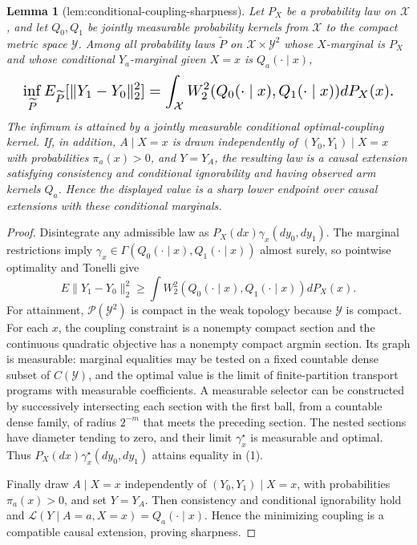 \documentclass{article}
\newtheorem{lemma}{Lemma}
\begin{document}
\begin{lemma}[lem:conditional-coupling-sharpness]\label{lem:conditional-coupling-sharpness}
Let \(P_X\) be a probability law on \(\mathcal X\), and let \(Q_0,Q_1\) be jointly measurable probability kernels from \(\mathcal X\) to the compact metric space \(\mathcal Y\). Among all probability laws \(\widetilde P\) on \(\mathcal X\times\mathcal Y^2\) whose \(X\)-marginal is \(P_X\) and whose conditional \(Y_a\)-marginal given \(X=x\) is \(Q_a(\cdot\mid x)\),
\[
\makebox[\linewidth][c]{\resizebox{0.98\linewidth}{!}{\par\noindent \makebox[\linewidth][c]{\resizebox{0.98\linewidth}{!}{\(\displaystyle \displaystyle \inf_{\widetilde P}E_{\widetilde P}[\lVert Y_1-Y_0\rVert_2^2]=\int_{\mathcal X}W_2^2(Q_0(\cdot\mid x),Q_1(\cdot\mid x))dP_X(x).\)}}\par\noindent}}
\]
The infimum is attained by a jointly measurable conditional optimal-coupling kernel. If, in addition, \(A\mid X=x\) is drawn independently of \((Y_0,Y_1)\mid X=x\) with probabilities \(\pi_a(x)>0\), and \(Y=Y_A\), the resulting law is a causal extension satisfying consistency and conditional ignorability and having observed arm kernels \(Q_a\). Hence the displayed value is a sharp lower endpoint over causal extensions with these conditional marginals.
\end{lemma}
\begin{proof}
Disintegrate any admissible law as \(P_X(dx)\gamma_x(dy_0,dy_1)\). The marginal restrictions imply \(\gamma_x\in\Gamma(Q_0(\cdot\mid x),Q_1(\cdot\mid x))\) almost surely, so pointwise optimality and Tonelli give
\[E\lVert Y_1-Y_0\rVert_2^2\ge\int W_2^2(Q_0(\cdot\mid x),Q_1(\cdot\mid x))dP_X(x).\tag{1}\]
For attainment, \(\mathcal P(\mathcal Y^2)\) is compact in the weak topology because \(\mathcal Y\) is compact. For each \(x\), the coupling constraint is a nonempty compact section and the continuous quadratic objective has a nonempty compact argmin section. Its graph is measurable: marginal equalities may be tested on a fixed countable dense subset of \(C(\mathcal Y)\), and the optimal value is the limit of finite-partition transport programs with measurable coefficients. A measurable selector can be constructed by successively intersecting each section with the first ball, from a countable dense family, of radius \(2^{-m}\) that meets the preceding section. The nested sections have diameter tending to zero, and their limit \(\gamma_x^\star\) is measurable and optimal. Thus \(P_X(dx)\gamma_x^\star(dy_0,dy_1)\) attains equality in (1).

Finally draw \(A\mid X=x\) independently of \((Y_0,Y_1)\mid X=x\), with probabilities \(\pi_a(x)>0\), and set \(Y=Y_A\). Then consistency and conditional ignorability hold and \(\mathcal L(Y\mid A=a,X=x)=Q_a(\cdot\mid x)\). Hence the minimizing coupling is a compatible causal extension, proving sharpness.
\end{proof}
\end{document}
